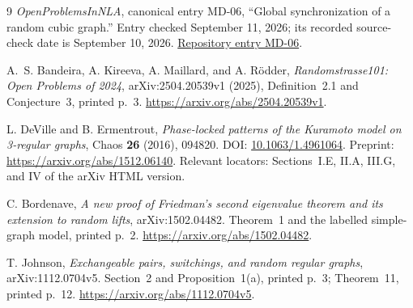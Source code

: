 \documentclass[11pt]{article}
\theoremstyle{definition}
\theoremstyle{remark}
\begin{document}
\begin{thebibliography}{9}
\small
\setlength{\itemsep}{4pt}
\emph{OpenProblemsInNLA}, canonical entry MD-06,
``Global synchronization of a random cubic graph.''
Entry checked September 11, 2026; its recorded source-check date is
September 10, 2026.
\href{https://github.com/ajt60gaibb/OpenProblemsInNLA/tree/main/matrix-discrepancy-and-optimization/MD-06}{Repository entry MD-06}.

A.~S. Bandeira, A. Kireeva, A. Maillard, and A. R\"odder,
\emph{Randomstrasse101: Open Problems of 2024},
arXiv:2504.20539v1 (2025), Definition~2.1 and Conjecture~3, printed p.~3.
\url{https://arxiv.org/abs/2504.20539v1}.

L. DeVille and B. Ermentrout,
\emph{Phase-locked patterns of the Kuramoto model on 3-regular graphs},
Chaos \textbf{26} (2016), 094820.
DOI: \href{https://doi.org/10.1063/1.4961064}{10.1063/1.4961064}.
Preprint: \url{https://arxiv.org/abs/1512.06140}.
Relevant locators: Sections~I.E, II.A, III.G, and IV of the arXiv HTML version.

C. Bordenave,
\emph{A new proof of Friedman's second eigenvalue theorem and its extension
to random lifts}, arXiv:1502.04482.
Theorem~1 and the labelled simple-graph model, printed p.~2.
\url{https://arxiv.org/abs/1502.04482}.

T. Johnson,
\emph{Exchangeable pairs, switchings, and random regular graphs},
arXiv:1112.0704v5.
Section~2 and Proposition~1(a), printed p.~3;
Theorem~11, printed p.~12.
\url{https://arxiv.org/abs/1112.0704v5}.
\end{thebibliography}
\end{document}
